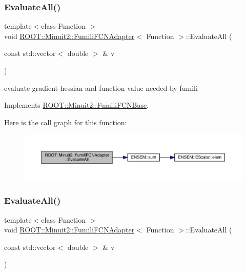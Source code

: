 \subsubsection{\texorpdfstring{EvaluateAll()}{EvaluateAll()}\hspace{0.1cm}{\footnotesize\ttfamily [1/3]}}
{\footnotesize\ttfamily template$<$class Function $>$ \\
void \mbox{\hyperlink{classROOT_1_1Minuit2_1_1FumiliFCNAdapter}{R\+O\+O\+T\+::\+Minuit2\+::\+Fumili\+F\+C\+N\+Adapter}}$<$ Function $>$\+::Evaluate\+All (\begin{DoxyParamCaption}\item[{const std\+::vector$<$ double $>$ \&}]{v }\end{DoxyParamCaption})\hspace{0.3cm}{\ttfamily [virtual]}}

evaluate gradient hessian and function value needed by fumili 

Implements \mbox{\hyperlink{classROOT_1_1Minuit2_1_1FumiliFCNBase_a0741bb4a7405cc33ab60583472a189cb}{R\+O\+O\+T\+::\+Minuit2\+::\+Fumili\+F\+C\+N\+Base}}.

Here is the call graph for this function\+:
\nopagebreak
\begin{figure}[H]
\begin{center}
\leavevmode
\includegraphics[width=350pt]{de/df6/classROOT_1_1Minuit2_1_1FumiliFCNAdapter_a75bacae09c510900a45ea753afae971a_cgraph}
\end{center}
\end{figure}
\mbox{\label{classROOT_1_1Minuit2_1_1FumiliFCNAdapter_a75bacae09c510900a45ea753afae971a}} 
\subsubsection{\texorpdfstring{EvaluateAll()}{EvaluateAll()}\hspace{0.1cm}{\footnotesize\ttfamily [2/3]}}
{\footnotesize\ttfamily template$<$class Function $>$ \\
void \mbox{\hyperlink{classROOT_1_1Minuit2_1_1FumiliFCNAdapter}{R\+O\+O\+T\+::\+Minuit2\+::\+Fumili\+F\+C\+N\+Adapter}}$<$ Function $>$\+::Evaluate\+All (\begin{DoxyParamCaption}\item[{const std\+::vector$<$ double $>$ \&}]{v }\end{DoxyParamCaption})\hspace{0.3cm}{\ttfamily [virtual]}}

